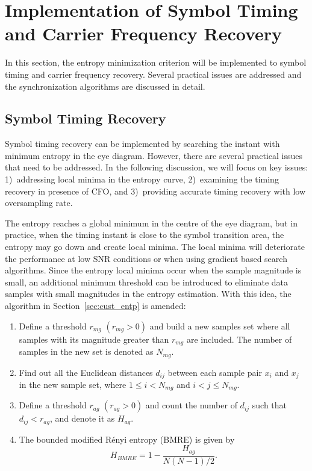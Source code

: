 \documentclass[journal,comsoc,onecolumn, 12pt,draftclsnofoot]{IEEEtran}
\begin{document}
\section{Implementation of Symbol Timing and Carrier Frequency Recovery}
\label{sec:imple}
In this section, the entropy minimization criterion will be implemented to symbol timing and carrier frequency recovery.
Several practical issues are addressed and the
synchronization algorithms are discussed in detail. 

\subsection{Symbol Timing Recovery} 
\label{sec:timing}
Symbol timing recovery can be implemented by searching the instant with minimum entropy in the eye diagram.
However, there are several practical issues that need to be addressed.
In the following discussion, we will focus on key issues: 
1)~addressing local minima in the entropy curve,  
2)~examining the timing recovery in presence of CFO, and 
3)~providing accurate timing recovery with low oversampling rate.

The entropy reaches a global minimum in the centre of the eye diagram, but in practice, when the timing instant is close to the symbol transition area, the entropy may go down and create local minima. 
The local minima will deteriorate the performance at low SNR conditions or when using gradient based search algorithms.
Since the entropy local minima occur when the sample magnitude is small, an additional minimum threshold can be introduced to eliminate data samples with small magnitudes in the entropy estimation.
With this idea, the algorithm in Section~\ref{sec:cust_entp} is amended:

\begin{enumerate}
\item Define a threshold \(r_{mg}\) \((r_{mg}>0)\) and build a new samples set where all samples with its magnitude greater than \(r_{mg}\) are included.
The number of samples in the new set is denoted as \(N_{mg}\).
\item Find out all the Euclidean distances \(d_{ij}\) between each sample pair \(x_i\) and \(x_j\) in the new sample set, where \(1\le i<N_{mg}\) and \( i<j \le N_{mg}\). 
\item Define a threshold \(r_{ag}\) \((r_{ag}>0)\) and count the number of \(d_{ij}\) such that $d_{ij}<r_{ag}$, and denote it as $H_{ag}$.
\item The bounded modified R\'enyi entropy (BMRE) is given by
\begin{equation}
H_{BMRE}= 1- \frac{ H_{ag}}{ N(N-1)/2}.
\label{eq:entorpy_ad2}
\end{equation}
\end{enumerate}
\end{document}
